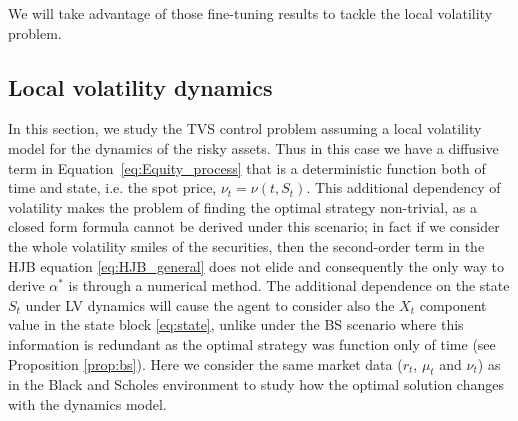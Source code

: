 \documentclass[runningheads]{m2ef}
\begin{document}
	We will take advantage of those fine-tuning results to tackle the local volatility problem.


	\subsection{Local volatility dynamics}
	In this section, we study the TVS control problem assuming a local volatility model for the dynamics of the risky assets. Thus in this case we have a diffusive term in Equation~\eqref{eq:Equity_process} that is a deterministic function both of time and state, i.e. the spot price, $\nu_t=\nu(t,S_t)$. This additional dependency of volatility makes the problem of finding the optimal strategy non-trivial, as a closed form formula cannot be derived under this scenario; in fact if we consider the whole volatility smiles of the securities, then the second-order term in the HJB equation \eqref{eq:HJB_general} does not elide and consequently the only way to derive $\alpha^*$ is through a numerical method. The additional dependence on the state $S_t$ under LV dynamics will cause the agent to consider also the $X_t$ component value in the  state block \eqref{eq:state}, unlike under the BS scenario where this information is redundant as the optimal strategy was function only of time (see Proposition \ref{prop:bs}). Here we consider the same market data ($r_t$, $\mu_t$ and $\nu_t$) as in the Black and Scholes environment to study how the optimal solution changes with the dynamics model. 
\end{document}
